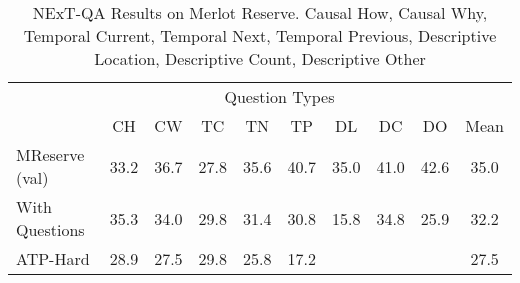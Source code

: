 \begin{table}[htpb]
	\centering
	\caption{NExT-QA Results on Merlot Reserve. Causal How, Causal Why,
	Temporal Current, Temporal Next, Temporal Previous, Descriptive Location,
	Descriptive Count, Descriptive Other}
	\label{tab:nextqa}
	\begin{tabular}{lccccccccc}
		\toprule
		\multicolumn{1}{c}{}  & \multicolumn{8}{c}{Question Types} & \multicolumn{1}{c}{}   \\
                                      \cmidrule(){2-9}
							  &  CH  &  CW  &  TC  &  TN  &  TP  &  DL  &  DC  &  DO  & Mean \\
		\cmidrule(r){1-1}             \cmidrule(){2-9}						 \cmidrule(){10-10}
		MReserve (val)        & 33.2 & 36.7 & 27.8 & 35.6 & 40.7 & 35.0 & 41.0 & 42.6 & 35.0 \\
		With Questions		  & 35.3 & 34.0 & 29.8 & 31.4 & 30.8 & 15.8 & 34.8 & 25.9 & 32.2 \\
		\midrule
		ATP-Hard			  &	28.9 & 27.5 & 29.8 & 25.8 &	17.2 &  	&      &      & 27.5 \\
		\midrule
		\bottomrule
	\end{tabular}
\end{table}


